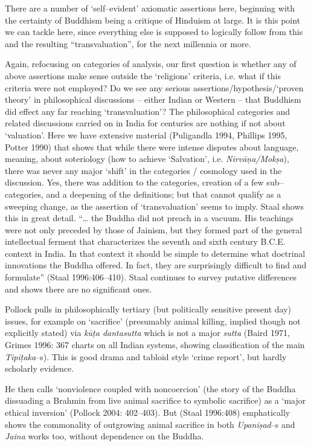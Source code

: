 There are a number of ‘self–evident’ axiomatic assertions here, beginning with the certainty of Buddhism being a critique of Hinduism at large. It is this point we can tackle here, since everything else is supposed to logically follow from this and the resulting “transvaluation”, for the next millennia or more.

Again, refocusing on categories of analysis, our first question is whether any of above assertions make sense outside the ‘religions’ criteria, i.e. what if this criteria were not employed? Do we see any serious assertions/hypothesis/‘proven theory’ in philosophical discussions – either Indian or Western – that Buddhism did effect any far reaching ‘transvaluation’? The philosophical categories and related discussions carried on in India for centuries are nothing if not about ‘valuation’. Here we have extensive material (Puligandla 1994, Phillips 1995, Potter 1990) that shows that while there were intense disputes about language, meaning, about soteriology (how to achieve ‘Salvation’, i.e. \textit{Nirvāṇa/Mokṣa}), there was never any major ‘shift’ in the categories / cosmology used in the discussion. Yes, there was addition to the categories, creation of a few sub–categories, and a deepening of the definitions; but that cannot qualify as a sweeping change, as the assertion of ‘transvaluation’ seems to imply. Staal shows this in great detail. “… the Buddha did not preach in a vacuum. His teachings were not only preceded by those of Jainism, but they formed part of the general intellectual ferment that characterizes the seventh and sixth century B.C.E. context in India. In that context it should be simple to determine what doctrinal innovations the Buddha offered. In fact, they are surprisingly difficult to find and formulate” (Staal 1996:406–410). Staal continues to survey putative differences and shows there are no significant ones.

Pollock pulls in philosophically tertiary (but politically sensitive present day) issues, for example on ‘sacrifice’ (presumably animal killing, implied though not explicitly stated) via \textit{kūṭa dantasutta} which is not a major \textit{sutta} (Baird 1971, Grimes 1996: 367 charts on all Indian systems, showing classification of the main \textit{Tipīṭaka}–s). This is good drama and tabloid style ‘crime report’, but hardly scholarly evidence.

He then calls ‘nonviolence coupled with noncoercion’ (the story of the Buddha dissuading a Brahmin from live animal sacrifice to symbolic sacrifice) as a ‘major ethical inversion’ (Pollock 2004: 402–403). But (Staal 1996:408) emphatically shows the commonality of outgrowing animal sacrifice in both \textit{Upaniṣad}–s and \textit{Jaina} works too, without dependence on the Buddha.

